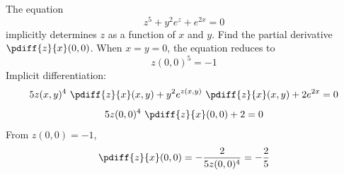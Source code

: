 \begin{eg}\label{eg partials E}
The equation
\begin{equation*}
z^5 + y^2 e^z +e^{2x}=0
\end{equation*}
implicitly determines $z$ as a function of $x$ and $y$.
Find the partial derivative $\pdiff{z}{x}(0,0)$.
\soln
When $x=y=0$, the equation reduces to
\begin{equation*}
z(0,0)^5=-1
\end{equation*}
Implicit differentiation:
\begin{equation*}
5z(x,y)^4\ \pdiff{z}{x}(x,y) + y^2 e^{z(x,y)}\ \pdiff{z}{x}(x,y) +2e^{2x}  =0
\end{equation*}
\begin{equation*}
5z(0,0)^4\ \pdiff{z}{x}(0,0) +2  =0
\end{equation*}
From $z(0,0)=-1$,
\begin{equation*}
\pdiff{z}{x}(0,0) = -\frac{2}{5z(0,0)^4} =-\frac{2}{5}
\end{equation*}
\end{eg}
